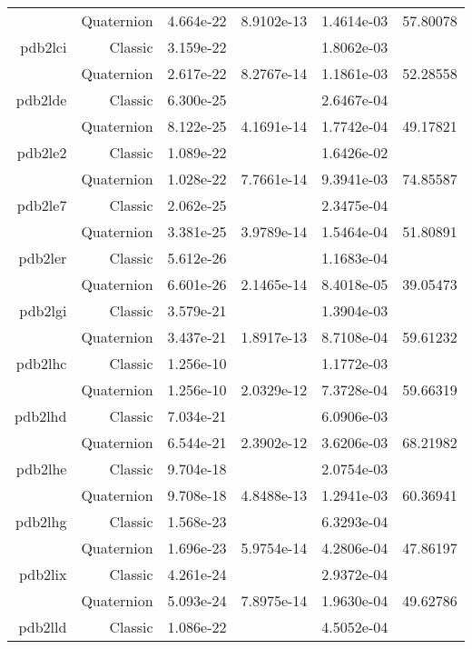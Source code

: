 \begin{xltabular}{\textwidth}{r|rS[table-format=1.3e+2]S[table-format=1.4e+2]S[table-format=1.4e+2]S[table-format=-1.5]}
& Quaternion & 4.664e-22 & 8.9102e-13 & 1.4614e-03 & 57.80078\\  \addlinespace
pdb2lci & Classic & 3.159e-22 &  & 1.8062e-03 & \\
& Quaternion & 2.617e-22 & 8.2767e-14 & 1.1861e-03 & 52.28558\\  \addlinespace
pdb2lde & Classic & 6.300e-25 &  & 2.6467e-04 & \\
& Quaternion & 8.122e-25 & 4.1691e-14 & 1.7742e-04 & 49.17821\\  \addlinespace
pdb2le2 & Classic & 1.089e-22 &  & 1.6426e-02 & \\
& Quaternion & 1.028e-22 & 7.7661e-14 & 9.3941e-03 & 74.85587\\  \addlinespace
pdb2le7 & Classic & 2.062e-25 &  & 2.3475e-04 & \\
& Quaternion & 3.381e-25 & 3.9789e-14 & 1.5464e-04 & 51.80891\\  \addlinespace
pdb2ler & Classic & 5.612e-26 &  & 1.1683e-04 & \\
& Quaternion & 6.601e-26 & 2.1465e-14 & 8.4018e-05 & 39.05473\\  \addlinespace
pdb2lgi & Classic & 3.579e-21 &  & 1.3904e-03 & \\
& Quaternion & 3.437e-21 & 1.8917e-13 & 8.7108e-04 & 59.61232\\  \addlinespace
pdb2lhc & Classic & 1.256e-10 &  & 1.1772e-03 & \\
& Quaternion & 1.256e-10 & 2.0329e-12 & 7.3728e-04 & 59.66319\\  \addlinespace
pdb2lhd & Classic & 7.034e-21 &  & 6.0906e-03 & \\
& Quaternion & 6.544e-21 & 2.3902e-12 & 3.6206e-03 & 68.21982\\  \addlinespace
pdb2lhe & Classic & 9.704e-18 &  & 2.0754e-03 & \\
& Quaternion & 9.708e-18 & 4.8488e-13 & 1.2941e-03 & 60.36941\\  \addlinespace
pdb2lhg & Classic & 1.568e-23 &  & 6.3293e-04 & \\
& Quaternion & 1.696e-23 & 5.9754e-14 & 4.2806e-04 & 47.86197\\  \addlinespace
pdb2lix & Classic & 4.261e-24 &  & 2.9372e-04 & \\
& Quaternion & 5.093e-24 & 7.8975e-14 & 1.9630e-04 & 49.62786\\  \addlinespace
pdb2lld & Classic & 1.086e-22 &  & 4.5052e-04 & \\

\end{xltabular}
